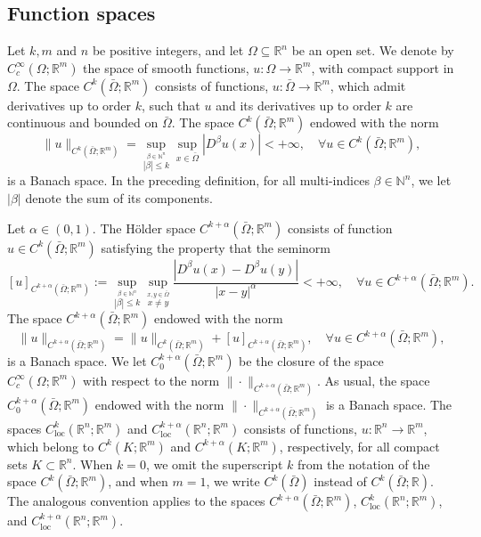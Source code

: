 \documentclass[11pt,reqno]{amsart}
\theoremstyle{definition}
\theoremstyle{remark}
\begin{document}
\subsection{Function spaces}
\label{subsec:Function_spaces}
Let $k, m$ and $n$ be positive integers, and let $\Omega\subseteq{\mathbb{R}}^n$ be an open set. We denote by $C^{\infty}_c(\Omega;{\mathbb{R}}^m)$ the space of smooth functions, $u:\Omega\rightarrow{\mathbb{R}}^m$, with compact support in $\Omega$. The space $C^k(\bar\Omega;{\mathbb{R}}^m)$ consists of functions, $u:\bar\Omega\rightarrow{\mathbb{R}}^m$, which admit derivatives up to order $k$, such that $u$ and its derivatives up to order $k$ are continuous and bounded on $\bar\Omega$. The space $C^k(\bar\Omega;{\mathbb{R}}^m)$ endowed with the norm
$$
\|u\|_{C^k(\bar\Omega;{\mathbb{R}}^m)} = \sup_{\stackrel{\beta\in{\mathbb{N}}^n}{|\beta| \leq k}}\sup_{x\in \bar\Omega} |D^{\beta}u(x)|<+\infty,\quad\forall u \in C^k(\bar\Omega;{\mathbb{R}}^m),
$$
is a Banach space. In the preceding definition, for all multi-indices $\beta\in{\mathbb{N}}^n$, we let $|\beta|$ denote the sum of its components. 

Let $\alpha \in (0,1)$. The H\"older space $C^{k+\alpha}(\bar\Omega;{\mathbb{R}}^m)$ consists of function $u\in C^k(\bar\Omega;{\mathbb{R}}^m)$ satisfying the property that the seminorm
$$
\left[u\right]_{C^{k+\alpha}(\bar\Omega;{\mathbb{R}}^m)}
:= \sup_{\stackrel{\beta\in{\mathbb{N}}^n}{|\beta| \leq k}}
\sup_{\stackrel{x, y \in \bar\Omega}{x \neq y}} \frac{|D^{\beta} u(x)-D^{\beta} u(y)|}{|x-y|^{\alpha}} < +\infty,
\quad\forall u \in C^{k+\alpha}(\bar\Omega;{\mathbb{R}}^m).
$$
The space $C^{k+\alpha}(\bar\Omega;{\mathbb{R}}^m)$ endowed with the norm
$$
\|u\|_{C^{k+\alpha}(\bar\Omega;{\mathbb{R}}^m)} = \|u\|_{C^k(\bar\Omega;{\mathbb{R}}^m)}+ \left[u\right]_{C^{k+\alpha}(\bar\Omega;{\mathbb{R}}^m)},
\quad\forall u \in C^{k+\alpha}(\bar\Omega;{\mathbb{R}}^m),
$$
is a Banach space. We let $C^{k+\alpha}_0(\bar\Omega;{\mathbb{R}}^m)$ be the closure of the space $C^{\infty}_c(\Omega;{\mathbb{R}}^m)$ with respect to the norm $\|\cdot\|_{C^{k+\alpha}(\bar\Omega;{\mathbb{R}}^m)}$. As usual, the space $C^{k+\alpha}_0(\bar\Omega;{\mathbb{R}}^m)$ endowed with the norm $\|\cdot\|_{C^{k+\alpha}(\bar\Omega;{\mathbb{R}}^m)}$ is a Banach space. The spaces $C^k_{\operatorname{loc}}({\mathbb{R}}^n;{\mathbb{R}}^m)$ and $C^{k+\alpha}_{\operatorname{loc}}({\mathbb{R}}^n;{\mathbb{R}}^m)$ consists of functions, $u:{\mathbb{R}}^n\rightarrow{\mathbb{R}}^m$, which belong to $C^k(K;{\mathbb{R}}^m)$ and $C^{k+\alpha}(K;{\mathbb{R}}^m)$, respectively, for all compact sets $K\subset{\mathbb{R}}^n$. When $k=0$, we omit the superscript $k$ from the notation of the space $C^k(\bar\Omega;{\mathbb{R}}^m)$, and when $m=1$, we write $C^k(\bar\Omega)$ instead of $C^k(\bar\Omega;{\mathbb{R}})$. The analogous convention applies to the spaces $C^{k+\alpha}(\bar\Omega;{\mathbb{R}}^m)$, $C^k_{\operatorname{loc}}({\mathbb{R}}^n;{\mathbb{R}}^m)$, and $C^{k+\alpha}_{\operatorname{loc}}({\mathbb{R}}^n;{\mathbb{R}}^m)$.
\end{document}
